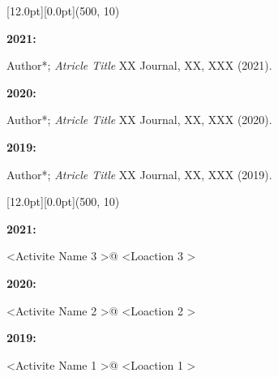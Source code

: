 \documentclass[12pt,a4paper]{report}
\begin{document}
    \begin{center}\begin{minipage}[t]{512pt}
        \colorbox{subtitlecolor}{\raisebox{0pt}[12.0pt][0.0pt]{\makebox(500, 10){
            \textcolor{white}{\ttfamily{}\selectfont{}}}}}\end{minipage}\end{center}    
    \begin{center}
        \begin{minipage}[t]{460pt}
            {\textbf{2021:}} \par
            \quad Author*; {\em{Atricle Title}} XX Journal, XX, XXX (2021).\par
            \vspace{4pt}\par
            {\textbf{2020:}} \par
            \quad Author*; {\em{Atricle Title}} XX Journal, XX, XXX (2020).\par
            \vspace{4pt}\par
            {\textbf{2019:}} \par
            \quad Author*; {\em{Atricle Title}} XX Journal, XX, XXX (2019).\par
        \end{minipage}
     \end{center}
    \begin{center}\begin{minipage}[t]{512pt}
        \colorbox{subtitlecolor}{\raisebox{0pt}[12.0pt][0.0pt]{\makebox(500, 10){
            \textcolor{white}{\ttfamily{}\selectfont{}}}}}\end{minipage}\end{center}    
    \begin{center}
        \begin{minipage}[t]{460pt}
            {\textbf{2021:}} \par
            \quad \textless Activite Name 3 \textgreater @ \textless Loaction 3 \textgreater \par
            \vspace{4pt}\par
            {\textbf{2020:}} \par
            \quad \textless Activite Name 2 \textgreater @ \textless Loaction 2 \textgreater \par
            \vspace{4pt}\par
            {\textbf{2019:}} \par
            \quad \textless Activite Name 1 \textgreater @ \textless Loaction 1 \textgreater \par
        \end{minipage}
     \end{center}
\end{document}
